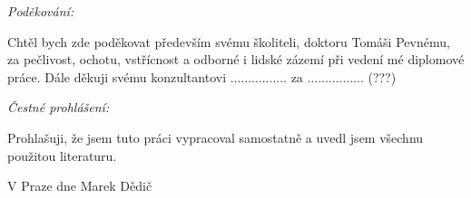 \noindent \textit{\Large Poděkování:}

\noindent Chtěl bych zde poděkovat především svému školiteli, doktoru Tomáši Pevnému,
za pečlivost, ochotu, vstřícnost a odborné i lidské zázemí při vedení
mé diplomové práce. Dále děkuji svému konzultantovi ................
za ................ (???)

\vfill

\noindent \textit{\Large Čestné prohlášení:}

\noindent Prohlašuji, že jsem tuto práci vypracoval samostatně a uvedl
jsem všechnu použitou literaturu.

\bigskip

\noindent V Praze dne \documentdate\hfill Marek Dědič

\vspace{2cm}
